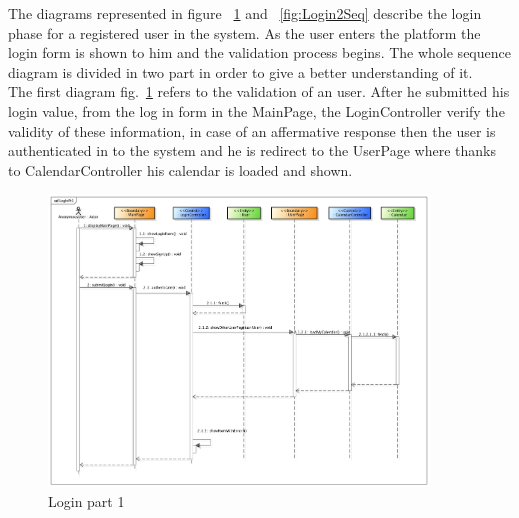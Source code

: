   The diagrams represented in figure ~\ref{fig:Login1Seq}  and ~\ref{fig:Login2Seq} describe the login phase for a registered user in the system. As the user enters the platform the login form is shown to him and the validation process begins. The whole sequence diagram is divided in two part in order to  give a better understanding of it.\\
  The first diagram fig.~\ref{fig:Login1Seq} refers to the validation of an user. After he submitted his login value, from the log in form in the MainPage, the LoginController verify the validity of these information, in case of an affermative response then the user is authenticated in to the system and he is redirect to the UserPage where thanks to CalendarController his calendar is loaded and shown.
  \begin{center}
 \begin{figure}[H]
    \includegraphics[width=0.9\textwidth]{../BCEDiagram/BCE/EntityOverview/LogInPt1.png}
    \caption{Login part 1}
     \label{fig:Login1Seq}
     \end{figure}
   \end{center}  
